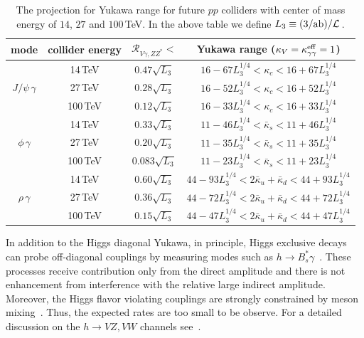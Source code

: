 \documentclass[../report.tex]{subfiles}
\newcommand{\cR}{\mathcal{R}}
\begin{document}
\begin{table}[t]
\begin{center}
\begin{tabular}{|c|c|c|c|}
\hline
mode & collider energy & $\cR_{V\gamma,ZZ^*}<$ &Yukawa range ($\kappa_V=\kappa^{\rm eff}_{\gamma\gamma}=1$)   \\
\hline\hline 
\multirow{ 3}{*}{$J/\psi\,\gamma$} &
14\,TeV & 
$0.47\sqrt{L_3}$ &
$16 - 67 L_3^{1/4}  < \kappa_c < 16 + 67 L_3^{1/4} $\\
&
27\,TeV & 
$0.28\sqrt{L_3}$ &
$16 - 52 L_3^{1/4}  < \kappa_c < 16 + 52 L_3^{1/4} $\\
&
100\,TeV & 
$0.12\sqrt{L_3}$ &
$16 - 33 L_3^{1/4}  < \kappa_c < 16 + 33 L_3^{1/4} $\\
\hline
\multirow{ 3}{*}{$\phi\,\gamma$} &
14\,TeV & 
$0.33\sqrt{L_3}$ &
$11 - 46 L_3^{1/4} < \bar{\kappa}_s < 11 + 46 L_3^{1/4} $\\
&
27\,TeV & 
$0.20\sqrt{L_3}$ &
$11 - 35 L_3^{1/4} < \bar{\kappa}_s < 11 + 35 L_3^{1/4} $\\
&
100\,TeV & 
$0.083\sqrt{L_3}$ &
$11 - 23 L_3^{1/4} < \bar{\kappa}_s < 11 + 23 L_3^{1/4} $\\
\hline
\multirow{ 3}{*}{$\rho\,\gamma$} &
14\,TeV & 
$0.60\sqrt{L_3}$ &
$44 - 93 L_3^{1/4} < 2\bar{\kappa}_u + \bar{\kappa}_d < 44 + 93 L_3^{1/4} $\\
&
27\,TeV & 
$0.36\sqrt{L_3}$ &
$44 - 72 L_3^{1/4} < 2\bar{\kappa}_u + \bar{\kappa}_d < 44 + 72 L_3^{1/4} $\\
&
100\,TeV & 
$0.15\sqrt{L_3}$ &
$44 - 47 L_3^{1/4} < 2\bar{\kappa}_u + \bar{\kappa}_d < 44 + 47 L_3^{1/4} $\\
\hline\hline
\end{tabular}
\end{center}
\caption{The projection for Yukawa range for future $pp$ colliders with center of mass energy of $14$, $27$ and $100\,$TeV. In the above table we define $L_3\equiv (3/{\rm ab})/\mathcal{L}\,$. }
\label{tab:exclusiveproj}
\end{table}%

In addition to the Higgs diagonal Yukawa, in principle, Higgs exclusive decays can probe off-diagonal couplings by measuring modes such as $h\to B^*_s \gamma$~\cite{Kagan:2014ila}. 
These processes receive contribution only from the direct amplitude and there is not enhancement from interference with the relative large indirect amplitude. 
Moreover, the Higgs flavor violating couplings are strongly constrained by meson mixing~\cite{Blankenburg:2012ex,Harnik:2012pb}. Thus, the expected rates are too small to be observe. 
For a detailed discussion on the $h \to VZ,VW$ channels see~\cite{Alte:2016yuw}.
\end{document}

